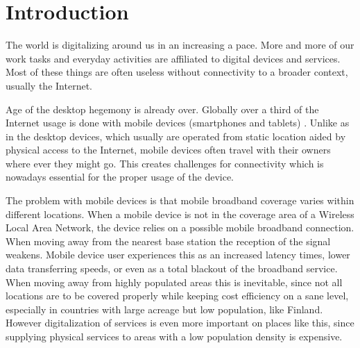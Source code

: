 \chapter{Introduction}



The world is digitalizing around us in an increasing a pace. More and more of our work tasks and everyday activities are affiliated to digital devices and services. Most of these things are often useless without connectivity to a broader context, usually the Internet.


Age of the desktop hegemony is already over. Globally over a third of the Internet usage is done with mobile devices (smartphones and tablets) \cite{statcounter_global_????}. Unlike as in the desktop devices, which usually are operated from static location aided by physical access to the Internet, mobile devices often travel with their owners where ever they might go. This creates challenges for connectivity which is nowadays essential for the proper usage of the device.

The problem with mobile devices is that mobile broadband coverage varies within different locations. When a mobile device is not in the coverage area of a Wireless Local Area Network, the device relies on a possible mobile broadband connection. When moving away from the nearest base station the reception of the signal weakens. Mobile device user experiences this as an increased latency times, lower data transferring speeds, or even as a total blackout of the broadband service. When moving away from highly populated areas this is inevitable, since not all locations are to be covered properly while keeping cost efficiency on a sane level, especially in countries with large acreage but low population, like Finland. However digitalization of services is even more important on places like this, since supplying physical services to areas with a low population density is expensive. 

